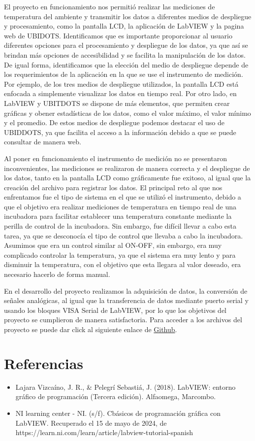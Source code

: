 El proyecto en funcionamiento nos permitió realizar las mediciones de temperatura del ambiente y transmitir los datos a diferentes medios de despliegue y procesamiento, como la pantalla LCD, la aplicación de LabVIEW y la pagina web de UBIDOTS. Identificamos que es importante proporcionar al usuario diferentes opciones para el procesamiento y despliegue de los datos, ya que así se brindan más opciones de accesibilidad y se facilita la manipulación de los datos. De igual forma, identificamos que la elección del medio de despliegue depende de los requerimientos de la aplicación en la que se use el instrumento de medición. Por ejemplo, de los tres medios de despliegue utilizados, la pantalla LCD está enfocada a simplemente visualizar los datos en tiempo real. Por otro lado, en LabVIEW y UBITDOTS se dispone de más elementos, que permiten crear gráficas y obener estadísticas de los datos, como el valor máximo, el valor mínimo y el promedio. De estos medios de despliegue podemos destacar el uso de UBIDDOTS, ya que facilita el acceso a la información debido a que se puede consultar de manera web.

Al poner en funcionamiento el instrumento de medición no se presentaron inconvenientes, las mediciones se realizaron de manera correcta y el despliegue de los datos, tanto en la pantalla LCD como gráficamente fue exitoso, al igual que la creación del archivo para registrar los datos. El principal reto al que nos enfrentamos fue el tipo de sistema en el que se utilizó el instrumento, debido a que el objetivo era realizar mediciones de temperatura en tiempo real de una incubadora para facilitar establecer una temperatura constante mediante la perilla de control de la incubadora. Sin embargo, fue difícil llevar a cabo esta tarea, ya que se desconocía el tipo de control que llevaba a cabo la incubadora. Asumimos que era un control similar al ON-OFF, sin embargo, era muy complicado controlar la temperatura, ya que el sistema era muy lento y para disminuir la temperatura, con el objetivo que esta llegara al valor deseado, era necesario hacerlo de forma manual.

En el desarrollo del proyecto realizamos la adquisición de datos, la conversión de señales analógicas, al igual que la transferencia de datos mediante puerto serial y usando los bloques VISA Serial de LabVIEW, por lo que los objetivos del proyecto se cumplieron de manera satisfactoria. Para acceder a los archivos del proyecto se puede dar click al siguiente enlace  de \href{https://github.com/damellie/LabView_IoT_Termopar}{Github}.

\section{Referencias}

\begin{itemize}
    \item Lajara Vizcaíno, J. R., & Pelegrí Sebastiá, J. (2018). LabVIEW: entorno gráfico de programación (Tercera edición). Alfaomega, Marcombo.
    \item NI learning center - NI. (s/f). Cbásicos de programación gráfica con LabVIEW. Recuperado el 15 de mayo de 2024, de https://learn.ni.com/learn/article/labview-tutorial-spanish
\end{itemize}